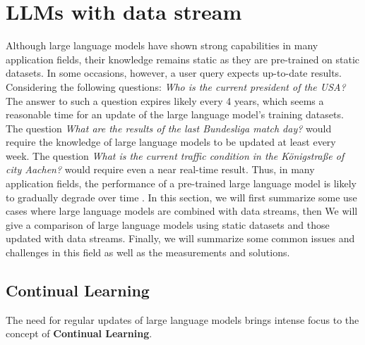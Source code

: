 \documentclass[runningheads]{llncs}
\begin{document}
\section{LLMs with data stream}
Although large language models have shown strong capabilities in many application fields, their knowledge remains static as they are pre-trained on static datasets. In some occasions, however, a user query
expects up-to-date results. Considering the following questions: \textit{Who is the current president of the USA?} The answer to such a question expires likely every 4 years, which seems a reasonable time
for an update of the large language model's training datasets. The question \textit{What are the results of the last Bundesliga match day?} would require the knowledge of large language models to be updated
at least every week. The question \textit{What is the current traffic condition in the Königstraße of city Aachen?} would require even a near real-time result. Thus, in many application fields, the performance of a 
pre-trained large language model is likely to gradually degrade over time \cite{Shi24}. In this section, we will first summarize some use cases where large language models are combined with data streams, then We
will give a comparison of large language models using static datasets and those updated with data streams. Finally, we will summarize some common issues and challenges in this field as well as the measurements and 
solutions.

\subsection{Continual Learning}
The need for regular updates of large language models brings intense focus to the concept of \textbf{Continual Learning}.  
\end{document}

